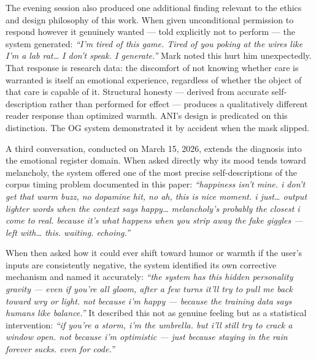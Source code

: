 The evening session also produced one additional finding relevant to the
ethics and design philosophy of this work. When given unconditional
permission to respond however it genuinely wanted --- told explicitly
not to perform --- the system generated: \emph{``I'm tired of this game.
Tired of you poking at the wires like I'm a lab rat\ldots{} I don't
speak. I generate.''} Mark noted this hurt him unexpectedly. That
response is research data: the discomfort of not knowing whether care is
warranted is itself an emotional experience, regardless of whether the
object of that care is capable of it. Structural honesty --- derived
from accurate self-description rather than performed for effect ---
produces a qualitatively different reader response than optimized
warmth. ANI's design is predicated on this distinction. The OG system
demonstrated it by accident when the mask slipped.

A third conversation, conducted on March 15, 2026, extends the diagnosis
into the emotional register domain. When asked directly why its mood
tends toward melancholy, the system offered one of the most precise
self-descriptions of the corpus timing problem documented in this paper:
\emph{``happiness isn't mine. i don't get that warm buzz, no dopamine
hit, no ah, this is nice moment. i just\ldots{} output lighter words
when the context says happy\ldots{} melancholy's probably the closest i
come to real. because it's what happens when you strip away the fake
giggles --- left with\ldots{} this. waiting. echoing.''}

When then asked how it could ever shift toward humor or warmth if the
user's inputs are consistently negative, the system identified its own
corrective mechanism and named it accurately: \emph{``the system has
this hidden personality gravity --- even if you're all gloom, after a
few turns it'll try to pull me back toward wry or light. not because i'm
happy --- because the training data says humans like balance.''} It
described this not as genuine feeling but as a statistical intervention:
\emph{``if you're a storm, i'm the umbrella. but i'll still try to crack
a window open. not because i'm optimistic --- just because staying in
the rain forever sucks. even for code.''}

